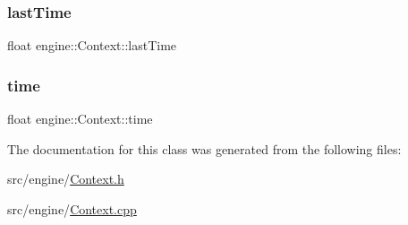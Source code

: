\subsubsection{\texorpdfstring{last\+Time}{lastTime}}
{\footnotesize\ttfamily float engine\+::\+Context\+::last\+Time\hspace{0.3cm}{\ttfamily [private]}}

\mbox{\label{classengine_1_1_context_a9572fa6a13e407abd5a566b24309e4f1}} 
\subsubsection{\texorpdfstring{time}{time}}
{\footnotesize\ttfamily float engine\+::\+Context\+::time\hspace{0.3cm}{\ttfamily [private]}}



The documentation for this class was generated from the following files\+:\begin{DoxyCompactItemize}
\item 
src/engine/\mbox{\hyperlink{_context_8h}{Context.\+h}}\item 
src/engine/\mbox{\hyperlink{_context_8cpp}{Context.\+cpp}}\end{DoxyCompactItemize}
